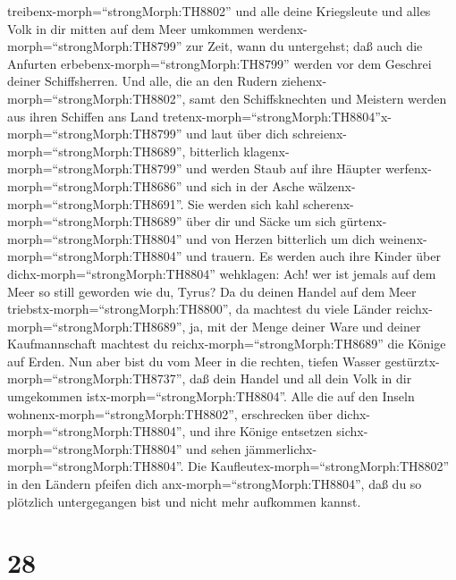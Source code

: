 treibenx-morph=``strongMorph:TH8802'' und alle deine Kriegsleute und
alles Volk in dir mitten auf dem Meer umkommen
werdenx-morph=``strongMorph:TH8799'' zur Zeit, wann du untergehst;
 daß auch die Anfurten
erbebenx-morph=``strongMorph:TH8799'' werden vor dem Geschrei deiner
Schiffsherren.  Und alle, die an den Rudern
ziehenx-morph=``strongMorph:TH8802'', samt den Schiffsknechten und
Meistern werden aus ihren Schiffen ans Land
tretenx-morph=``strongMorph:TH8804''x-morph=``strongMorph:TH8799''
 und laut über dich schreienx-morph=``strongMorph:TH8689'',
bitterlich klagenx-morph=``strongMorph:TH8799'' und werden Staub auf
ihre Häupter werfenx-morph=``strongMorph:TH8686'' und sich in der Asche
wälzenx-morph=``strongMorph:TH8691''.  Sie werden sich kahl
scherenx-morph=``strongMorph:TH8689'' über dir und Säcke um sich
gürtenx-morph=``strongMorph:TH8804'' und von Herzen bitterlich um dich
weinenx-morph=``strongMorph:TH8804'' und trauern.  Es
werden auch ihre Kinder über dichx-morph=``strongMorph:TH8804''
wehklagen: Ach! wer ist jemals auf dem Meer so still geworden wie du,
Tyrus?  Da du deinen Handel auf dem Meer
triebstx-morph=``strongMorph:TH8800'', da machtest du viele Länder
reichx-morph=``strongMorph:TH8689'', ja, mit der Menge deiner Ware und
deiner Kaufmannschaft machtest du reichx-morph=``strongMorph:TH8689''
die Könige auf Erden.  Nun aber bist du vom Meer in die
rechten, tiefen Wasser gestürztx-morph=``strongMorph:TH8737'', daß dein
Handel und all dein Volk in dir umgekommen
istx-morph=``strongMorph:TH8804''.  Alle die auf den Inseln
wohnenx-morph=``strongMorph:TH8802'', erschrecken über
dichx-morph=``strongMorph:TH8804'', und ihre Könige entsetzen
sichx-morph=``strongMorph:TH8804'' und sehen
jämmerlichx-morph=``strongMorph:TH8804''.  Die
Kaufleutex-morph=``strongMorph:TH8802'' in den Ländern pfeifen dich
anx-morph=``strongMorph:TH8804'', daß du so plötzlich untergegangen bist
und nicht mehr aufkommen kannst.

\hypertarget{section-27}{%
\section{28}\label{section-27}}


